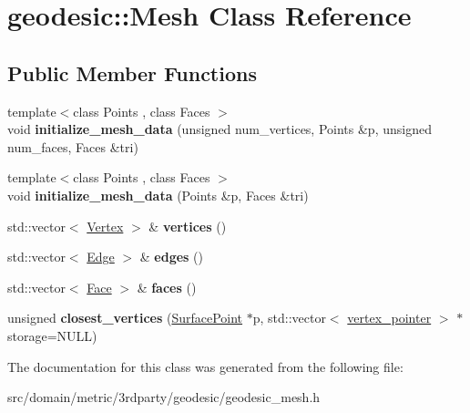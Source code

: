 \hypertarget{classgeodesic_1_1_mesh}{}\section{geodesic\+:\+:Mesh Class Reference}
\label{classgeodesic_1_1_mesh}
\subsection*{Public Member Functions}
\begin{DoxyCompactItemize}
\item 
\hypertarget{classgeodesic_1_1_mesh_a93872801bd0c82c4586796a0d31023b1}{}{\footnotesize template$<$class Points , class Faces $>$ }\\void {\bfseries initialize\+\_\+mesh\+\_\+data} (unsigned num\+\_\+vertices, Points \&p, unsigned num\+\_\+faces, Faces \&tri)\label{classgeodesic_1_1_mesh_a93872801bd0c82c4586796a0d31023b1}

\item 
\hypertarget{classgeodesic_1_1_mesh_af3364382b9b1cd2762a12b644f4632b0}{}{\footnotesize template$<$class Points , class Faces $>$ }\\void {\bfseries initialize\+\_\+mesh\+\_\+data} (Points \&p, Faces \&tri)\label{classgeodesic_1_1_mesh_af3364382b9b1cd2762a12b644f4632b0}

\item 
\hypertarget{classgeodesic_1_1_mesh_a8b0c9bb6dec5f17d1d6798a5c4a91436}{}std\+::vector$<$ \hyperlink{classgeodesic_1_1_vertex}{Vertex} $>$ \& {\bfseries vertices} ()\label{classgeodesic_1_1_mesh_a8b0c9bb6dec5f17d1d6798a5c4a91436}

\item 
\hypertarget{classgeodesic_1_1_mesh_a4e972d008fb509a1fc1c8e12a050dde6}{}std\+::vector$<$ \hyperlink{classgeodesic_1_1_edge}{Edge} $>$ \& {\bfseries edges} ()\label{classgeodesic_1_1_mesh_a4e972d008fb509a1fc1c8e12a050dde6}

\item 
\hypertarget{classgeodesic_1_1_mesh_aea5069def2b66f0dfb008b16f11ce786}{}std\+::vector$<$ \hyperlink{classgeodesic_1_1_face}{Face} $>$ \& {\bfseries faces} ()\label{classgeodesic_1_1_mesh_aea5069def2b66f0dfb008b16f11ce786}

\item 
\hypertarget{classgeodesic_1_1_mesh_ad429dde54ea2a57b6e0bf245ba34b213}{}unsigned {\bfseries closest\+\_\+vertices} (\hyperlink{classgeodesic_1_1_surface_point}{Surface\+Point} $\ast$p, std\+::vector$<$ \hyperlink{classgeodesic_1_1_vertex}{vertex\+\_\+pointer} $>$ $\ast$storage=N\+U\+L\+L)\label{classgeodesic_1_1_mesh_ad429dde54ea2a57b6e0bf245ba34b213}

\end{DoxyCompactItemize}


The documentation for this class was generated from the following file\+:\begin{DoxyCompactItemize}
\item 
src/domain/metric/3rdparty/geodesic/geodesic\+\_\+mesh.\+h\end{DoxyCompactItemize}
